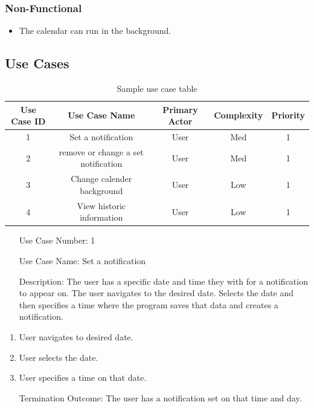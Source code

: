 \documentclass[10pt,conference,onecolumn,compsoc]{IEEEtran}
\begin{document}
\subsubsection{Non-Functional}
\begin{itemize}
\item The calendar can run in the background.
\end{itemize}

\subsection{Use Cases}

\begin{table}
\centering
\begin{tabular}{|c|c|c|c|c|}
\hline
Use Case ID & Use Case Name & Primary Actor & Complexity & Priority\\
\hline
1 & Set a notification & User & Med & 1\\
\hline
2 & remove or change a set notification & User & Med & 1\\
\hline
3 & Change calender background & User & Low & 1\\
\hline
4 & View historic information & User & Low & 1\\
\hline

\end{tabular}
\caption{Sample use case table}
\label{tab:useCaseIndex}
\end{table}

\begin{itemize}
\item[Use Case Number:] 1
\item[Use Case Name:] Set a notification
\item[Description:] The user has a specific date and time they with for a notification to appear on. The user navigates to the desired date. Selects the date and then specifies a time where the program saves that data and creates a notification.
\end{itemize}

\begin{enumerate}
\item User navigates to desired date.
\item User selects the date.
\item User specifies a time on that date.
\item[Termination Outcome:] The user has a notification set on that time and day.
\end{enumerate}
\end{document}
